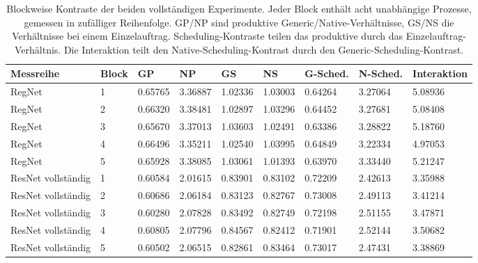 \begin{table}[t]
\centering
\caption{Blockweise Kontraste der beiden vollständigen Experimente. Jeder Block enthält acht unabhängige Prozesse, gemessen in zufälliger Reihenfolge. GP/NP sind produktive Generic/Native-Verhältnisse, GS/NS die Verhältnisse bei einem Einzelauftrag. Scheduling-Kontraste teilen das produktive durch das Einzelauftrag-Verhältnis. Die Interaktion teilt den Native-Scheduling-Kontrast durch den Generic-Scheduling-Kontrast.}
\label{tab:supp-scheduling-blocks}
\begingroup\small\setlength{\tabcolsep}{3pt}
\begin{tabular}{lllllllll}
\toprule
Messreihe & Block & GP & NP & GS & NS & G-Sched. & N-Sched. & Interaktion \\
\midrule
RegNet & 1 & 0.65765 & 3.36887 & 1.02336 & 1.03003 & 0.64264 & 3.27064 & 5.08936 \\
RegNet & 2 & 0.66320 & 3.38481 & 1.02897 & 1.03296 & 0.64452 & 3.27681 & 5.08408 \\
RegNet & 3 & 0.65670 & 3.37013 & 1.03603 & 1.02491 & 0.63386 & 3.28822 & 5.18760 \\
RegNet & 4 & 0.66496 & 3.35211 & 1.02540 & 1.03995 & 0.64849 & 3.22334 & 4.97053 \\
RegNet & 5 & 0.65928 & 3.38085 & 1.03061 & 1.01393 & 0.63970 & 3.33440 & 5.21247 \\
ResNet vollständig & 1 & 0.60584 & 2.01615 & 0.83901 & 0.83102 & 0.72209 & 2.42613 & 3.35988 \\
ResNet vollständig & 2 & 0.60686 & 2.06184 & 0.83123 & 0.82767 & 0.73008 & 2.49113 & 3.41214 \\
ResNet vollständig & 3 & 0.60280 & 2.07828 & 0.83492 & 0.82749 & 0.72198 & 2.51155 & 3.47871 \\
ResNet vollständig & 4 & 0.60805 & 2.07796 & 0.84567 & 0.82412 & 0.71901 & 2.52144 & 3.50682 \\
ResNet vollständig & 5 & 0.60502 & 2.06515 & 0.82861 & 0.83464 & 0.73017 & 2.47431 & 3.38869 \\
\bottomrule
\end{tabular}
\endgroup
\end{table}
